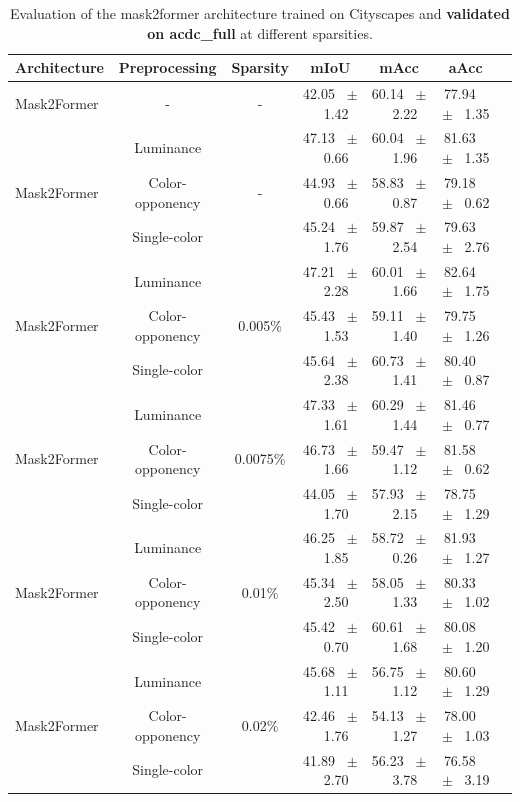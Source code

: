 \begin{table}[h]
  \centering
  \caption{Evaluation of the mask2former architecture trained on Cityscapes and \textbf{validated on acdc_full} at different sparsities.}
  \begin{tabular}{@{}lccc ccc@{}}
    \toprule
    Architecture & Preprocessing & Sparsity & mIoU & mAcc & aAcc \\
    \midrule
    Mask2Former & - & - & 42.05 ~$\pm$~ 1.42 & 60.14 ~$\pm$~ 2.22 & 77.94 ~$\pm$~ 1.35 \\
    \midrule
    \midrule
    \multirow{3}{*}{Mask2Former} & Luminance & \multirow{3}{*}{-} & 47.13 ~$\pm$~ 0.66 & 60.04 ~$\pm$~ 1.96 & 81.63 ~$\pm$~ 1.35 \\
    & Color-opponency & & 44.93 ~$\pm$~ 0.66 & 58.83 ~$\pm$~ 0.87 & 79.18 ~$\pm$~ 0.62 \\
    & Single-color & & 45.24 ~$\pm$~ 1.76 & 59.87 ~$\pm$~ 2.54 & 79.63 ~$\pm$~ 2.76 \\
    \midrule
    \multirow{3}{*}{Mask2Former} & Luminance & \multirow{3}{*}{0.005\%} & 47.21 ~$\pm$~ 2.28 & 60.01 ~$\pm$~ 1.66 & 82.64 ~$\pm$~ 1.75 \\
    & Color-opponency & & 45.43 ~$\pm$~ 1.53 & 59.11 ~$\pm$~ 1.40 & 79.75 ~$\pm$~ 1.26 \\
    & Single-color & & 45.64 ~$\pm$~ 2.38 & 60.73 ~$\pm$~ 1.41 & 80.40 ~$\pm$~ 0.87 \\
    \midrule
    \multirow{3}{*}{Mask2Former} & Luminance & \multirow{3}{*}{0.0075\%} & 47.33 ~$\pm$~ 1.61 & 60.29 ~$\pm$~ 1.44 & 81.46 ~$\pm$~ 0.77 \\
    & Color-opponency & & 46.73 ~$\pm$~ 1.66 & 59.47 ~$\pm$~ 1.12 & 81.58 ~$\pm$~ 0.62 \\
    & Single-color & & 44.05 ~$\pm$~ 1.70 & 57.93 ~$\pm$~ 2.15 & 78.75 ~$\pm$~ 1.29 \\
    \midrule
    \multirow{3}{*}{Mask2Former} & Luminance & \multirow{3}{*}{0.01\%} & 46.25 ~$\pm$~ 1.85 & 58.72 ~$\pm$~ 0.26 & 81.93 ~$\pm$~ 1.27 \\
    & Color-opponency & & 45.34 ~$\pm$~ 2.50 & 58.05 ~$\pm$~ 1.33 & 80.33 ~$\pm$~ 1.02 \\
    & Single-color & & 45.42 ~$\pm$~ 0.70 & 60.61 ~$\pm$~ 1.68 & 80.08 ~$\pm$~ 1.20 \\
    \midrule
    \multirow{3}{*}{Mask2Former} & Luminance & \multirow{3}{*}{0.02\%} & 45.68 ~$\pm$~ 1.11 & 56.75 ~$\pm$~ 1.12 & 80.60 ~$\pm$~ 1.29 \\
    & Color-opponency & & 42.46 ~$\pm$~ 1.76 & 54.13 ~$\pm$~ 1.27 & 78.00 ~$\pm$~ 1.03 \\
    & Single-color & & 41.89 ~$\pm$~ 2.70 & 56.23 ~$\pm$~ 3.78 & 76.58 ~$\pm$~ 3.19 \\
    \midrule
    \bottomrule
  \end{tabular}
  \label{tab:sparse_mask2former_acdc_full}
\end{table}